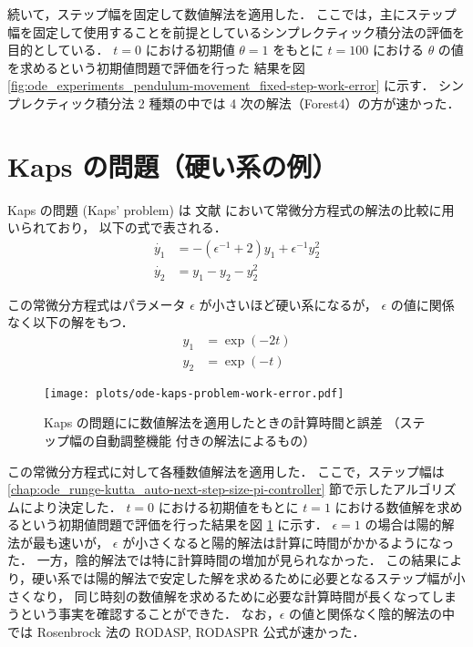 続いて，ステップ幅を固定して数値解法を適用した．
ここでは，主にステップ幅を固定して使用することを前提としているシンプレクティック積分法の評価を目的としている．
$t=0$ における初期値 $\theta = 1$ をもとに $t=100$ における $\theta$ の値を求めるという初期値問題で評価を行った
結果を図
\ref{fig:ode_experiments_pendulum-movement_fixed-step-work-error}
に示す．
シンプレクティック積分法 2 種類の中では 4 次の解法（Forest4）の方が速かった．

\clearpage

\section{Kaps の問題（硬い系の例）}

Kaps の問題 (Kaps' problem) は
文献 \cite{Kennedy2003} において常微分方程式の解法の比較に用いられており，
以下の式で表される．
\begin{align}
    \dot{y_1} & = -(\epsilon^{-1} + 2) y_1 + \epsilon^{-1} y_2^2 \\
    \dot{y_2} & = y_1 - y_2 - y_2^2
\end{align}

この常微分方程式はパラメータ $\epsilon$ が小さいほど硬い系になるが，
$\epsilon$ の値に関係なく以下の解をもつ．
\begin{align}
    y_1 & = \exp(-2t) \\
    y_2 & = \exp(-t)
\end{align}

\begin{figure}[tp]
    \centering
    \texttt{[image: plots/ode-kaps-problem-work-error.pdf]}
    \caption{Kaps の問題にに数値解法を適用したときの計算時間と誤差%
        （ステップ幅の自動調整機能 \cite{Gustafsson1991} 付きの解法によるもの）}
    \label{fig:ode_experiments_kaps-problem_work-error}
\end{figure}

この常微分方程式に対して各種数値解法を適用した．
ここで，ステップ幅は \ref{chap:ode_runge-kutta_auto-next-step-size-pi-controller} 節で示したアルゴリズムにより決定した．
$t=0$ における初期値をもとに $t=1$ における数値解を求めるという初期値問題で評価を行った結果を図
\ref{fig:ode_experiments_kaps-problem_work-error}
に示す．
$\epsilon = 1$ の場合は陽的解法が最も速いが，
$\epsilon$ が小さくなると陽的解法は計算に時間がかかるようになった．
一方，陰的解法では特に計算時間の増加が見られなかった．
この結果により，硬い系では陽的解法で安定した解を求めるために必要となるステップ幅が小さくなり，
同じ時刻の数値解を求めるために必要な計算時間が長くなってしまうという事実を確認することができた．
なお，$\epsilon$ の値と関係なく陰的解法の中では Rosenbrock 法の RODASP, RODASPR 公式が速かった．
